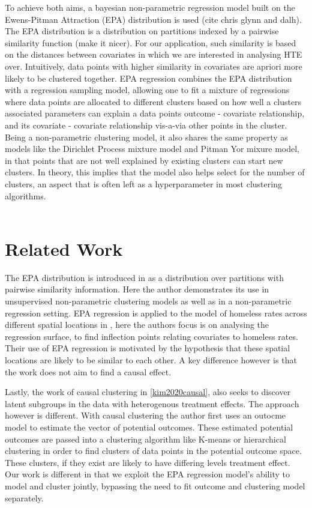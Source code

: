 \documentclass{article}
\begin{document}
To achieve both aims, a bayesian non-parametric regression model built on the Ewens-Pitman Attraction (EPA) distribution is used (cite chris glynn and dalh). The EPA distribution is a distribution on partitions indexed by a pairwise similarity function (make it nicer). For our application, such similarity is based on the distances between covariates in which we are interested in analysing HTE over. Intuitively, data points with higher similarity in covariates are apriori more likely to be clustered together. EPA regression combines the EPA distribution with a regression sampling model, allowing one to fit a mixture of regressions where data points are allocated to different clusters based on how well a clusters associated parameters can explain a data points outcome - covariate relationship, and its covariate - covariate relationship vis-a-via other points in the cluster. Being a non-parametric clustering model, it also shares the same property as models like the Dirichlet Process mixture model and Pitman Yor mixure model, in that points that are not well explained by existing clusters can start new clusters. In theory, this implies that the model also helps select for the number of clusters, an aspect that is often left as a hyperparameter in most clustering algorithms.
\\ \\ 
\section{Related Work}

The EPA distribution is introduced in \cite{dahl2017random} as a distribution over partitions with pairwise similarity information. Here the author demonstrates its use in unsupervised non-parametric clustering models as well as in a non-parametric regression setting. EPA regression is applied to the model of homeless rates across different spatial locations in \cite{glynn2021inflection}, here the authors focus is on analysing the regression surface, to find inflection points relating covariates to homeless rates. Their use of EPA regression is motivated by the hypothesis that these spatial locations are likely to be similar to each other.  A key difference however is that the work does not aim to find a causal effect.

Lastly, the work of causal clustering in \ref{kim2020causal}, also seeks to discover latent subgroups in the data with heterogenous treatment effects. The approach however is different. With causal clustering the author first uses an outocme model to estimate the vector of potential outcomes. These estimated potential outcomes are passed into a clustering algorithm like K-means or hierarchical clustering in order to find clusters of data points in the potential outcome space. These clusters, if they exist are likely to have differing levels treatment effect. Our work is different in that we exploit the EPA regression model's ability to model and cluster jointly, bypassing the need to fit outcome and clustering model separately. 
\end{document}
